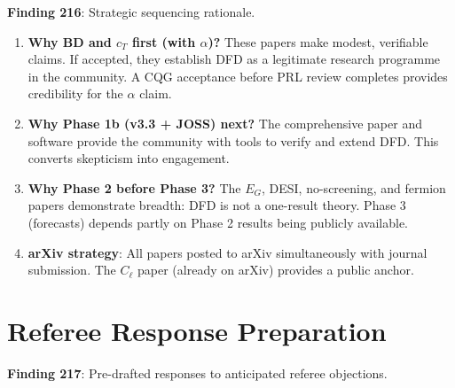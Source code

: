 \documentclass[11pt,a4paper]{article}
\begin{document}
\textbf{Finding 216}: Strategic sequencing rationale.

\begin{enumerate}[nosep]
\item \textbf{Why BD and $c_T$ first (with $\alpha$)?} These papers make modest, verifiable claims. If accepted, they establish DFD as a legitimate research programme in the community. A CQG acceptance before PRL review completes provides credibility for the $\alpha$ claim.

\item \textbf{Why Phase 1b (v3.3 + JOSS) next?} The comprehensive paper and software provide the community with tools to verify and extend DFD. This converts skepticism into engagement.

\item \textbf{Why Phase 2 before Phase 3?} The $E_G$, DESI, no-screening, and fermion papers demonstrate breadth: DFD is not a one-result theory. Phase 3 (forecasts) depends partly on Phase 2 results being publicly available.

\item \textbf{arXiv strategy}: All papers posted to arXiv simultaneously with journal submission. The $C_\ell$ paper (already on arXiv) provides a public anchor.
\end{enumerate}

\section{Referee Response Preparation}

\textbf{Finding 217}: Pre-drafted responses to anticipated referee objections.
\end{document}
